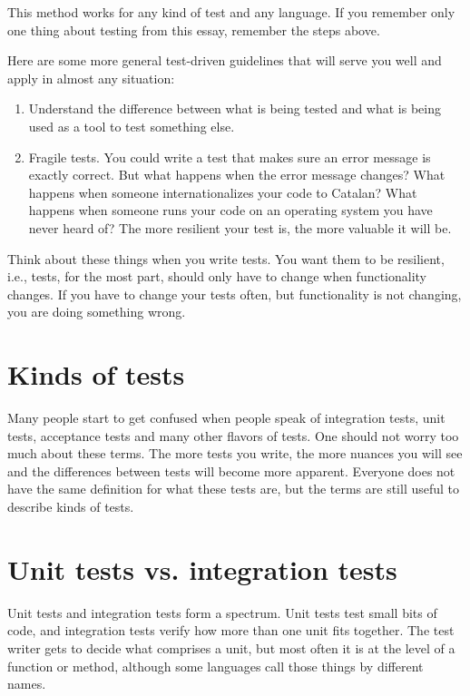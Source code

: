 This method works for any kind of test and any language. If you remember only one thing about testing from this essay, remember the steps above.

Here are some more general test-driven guidelines that will serve you well and
apply in almost any situation:
\begin{enumerate}
 \item Understand the difference between what is being tested and what is being
used as a tool to test something else.
 \item Fragile tests. You could write a test that makes sure an error message is
exactly correct. But what happens when the error message changes? What happens
when someone internationalizes your code to Catalan? What happens when someone
runs your code on an operating system you have never heard of? The more resilient your test is,
the more valuable it will be.
\end{enumerate}

Think about these things when you write tests. You want them to be resilient,
i.e., tests, for the most part, should only have to change when functionality
changes. If you have to change your tests often, but functionality is not
changing, you are doing something wrong.

\section*{Kinds of tests}

Many people start to get confused when people speak of integration tests,
unit tests, acceptance tests and many other flavors of tests. One
should not worry too much about these terms. The more tests you write, the more
nuances you will see and the differences between tests will become more
apparent. Everyone does not have the same definition for what these tests are,
but the terms are still useful to describe kinds of tests.

\section*{Unit tests vs. integration tests}

Unit tests and integration tests form a spectrum. Unit tests test small bits of
code, and integration tests verify how more than one unit fits together. The test
writer gets to decide what comprises a unit, but most often it is at the level
of a function or method, although some languages call those things by different
names.

